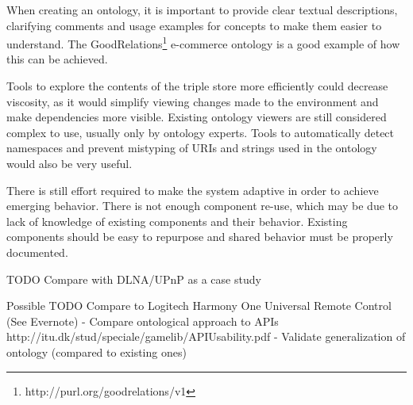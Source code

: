 When creating an ontology, it is important to provide clear textual descriptions, clarifying comments and usage examples for concepts to make them easier to understand. The GoodRelations\footnote{http://purl.org/goodrelations/v1} e-commerce ontology is a good example of how this can be achieved.

Tools to explore the contents of the triple store more efficiently could decrease viscosity, as it would simplify viewing changes made to the environment and make dependencies more visible. Existing ontology viewers are still considered complex to use, usually only by ontology experts. Tools to automatically detect namespaces and prevent mistyping of URIs and strings used in the ontology would also be very useful.

There is still effort required to make the system adaptive in order to achieve emerging behavior. There is not enough component re-use, which may be due to lack of knowledge of existing components and their behavior. Existing components should be easy to repurpose and shared behavior must be properly documented. 








TODO Compare with DLNA/UPnP as a case study

Possible TODO
Compare to Logitech Harmony One Universal Remote Control (See Evernote)
- Compare ontological approach to APIs http://itu.dk/stud/speciale/gamelib/APIUsability.pdf
- Validate generalization of ontology (compared to existing ones)